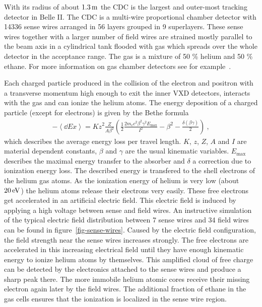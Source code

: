 With its radius of about $\unit[1.3]{m}$ the CDC is the largest and outer-most tracking detector in Belle II. The CDC is a multi-wire proportional chamber detector with 14336 sense wires arranged in 56 layers grouped in 9 superlayers. These sense wires together with a larger number of field wires are strained mostly parallel to the beam axis in a cylindrical tank flooded with gas which spreads over the whole detector in the acceptance range. The gas is a mixture of 50 \% helium and 50 \% ethane. For more information on gas chamber detectors see for example~\cite{grupen}.

Each charged particle produced in the collision of the electron and positron with a transverse momentum high enough to exit the inner VXD detectors, interacts with the gas and can ionize the helium atoms. The energy deposition of a charged particle (except for electrons) is given by the Bethe formula~\cite{bethe}
\begin{align}
 - \left\langle \dd{E}{x} \right\rangle = K z^2 \frac{Z}{A \beta^2} \left( \frac 1 2 \frac{2 m_e c^2 \beta^2 \gamma^2 E_\text{max}}{I^2} - \beta^2 - \frac{\delta(\beta \gamma)}{2}  \right) \ , \label{form-bethe}
\end{align}
which describes the average energy loss per travel length. $K$, $z$, $Z$, $A$ and $I$ are material dependent constants, $\beta$ and $\gamma$ are the usual kinematic variables. $E_\text{max}$ describes the maximal energy transfer to the absorber and $\delta$ a correction due to ionization energy loss. The described energy is transfered to the shell electrons of the helium gas atoms. As the ionization energy of helium is very low (about $\unit[20]{eV}$) the helium atoms release their electrons very easily. These free electrons get accelerated in an artificial electric field. This electric field is induced by applying a high voltage between sense and field wires. An instructive simulation of the typical electric field distribution between 7 sense wires and 34 field wires can be found in figure~\ref{fig-sense-wires}. Caused by the electric field configuration, the field strength near the sense wires increases strongly. The free electrons are accelerated in this increasing electrical field until they have enough kinematic energy to ionize helium atoms by themselves. This amplified cloud of free charge can be detected by the electronics attached to the sense wires and produce a sharp peak there. The more immobile helium atomic cores receive their missing electron again later by the field wires. The additional fraction of ethane in the gas cells ensures that the ionization is localized in the sense wire region.

